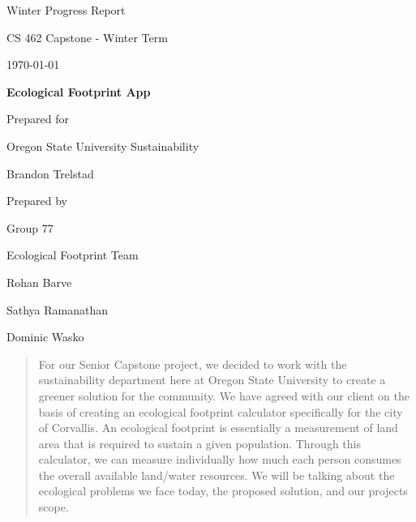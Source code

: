 \documentclass[onecolumn, draftclsnofoot,10pt, compsoc, tikz]{IEEEtran}
\def \CapstoneTeamName{		Ecological Footprint Team}
\def \CapstoneTeamNumber{		77}
\def \GroupMemberOne{			Rohan Barve}
\def \GroupMemberTwo{			Sathya Ramanathan}
\def \GroupMemberThree{			Dominic Wasko}
\def \CapstoneProjectName{		Ecological Footprint App}
\def \CapstoneSponsorCompany{	Oregon State University Sustainability}
\def \CapstoneSponsorPerson{		Brandon Trelstad} %
\def \DocType{Winter Progress Report}
\newcommand{\NameSigPair}[1]{\par
\makebox[2.75in][r]{#1} \hfil 	\makebox[3.25in]{\makebox[2.25in]{\hrulefill} \hfill		\makebox[.75in]{\hrulefill}}
\par\vspace{-12pt} \textit{\tiny\noindent
\makebox[2.75in]{} \hfil		\makebox[3.25in]{\makebox[2.25in][r]{Signature} \hfill	\makebox[.75in][r]{Date}}}}
\renewcommand{\NameSigPair}[1]{#1}
\begin{document}
\begin{titlepage}
    \begin{singlespace}
        \hfill 
        \par\vspace{.2in}
        \centering
        \scshape{
	 \huge \DocType \par
            \huge CS 462 Capstone - Winter Term \par
            {\large\today}\par
            \vspace{.5in}
            \textbf{\Huge\CapstoneProjectName}\par
            \vfill
            {\large Prepared for}\par
            \Huge \CapstoneSponsorCompany\par
            \vspace{5pt}
            {\Large\NameSigPair{\CapstoneSponsorPerson}\par}
            {\large Prepared by }\par
            Group\CapstoneTeamNumber\par
            \CapstoneTeamName\par 
            \vspace{5pt}
            {\Large
                \NameSigPair{\GroupMemberOne}\par
                \NameSigPair{\GroupMemberTwo}\par
                \NameSigPair{\GroupMemberThree}\par
            }
            \vspace{20pt}
        }
        
        \begin{abstract}
        	For our Senior Capstone project, we decided to work with the sustainability department here at Oregon State University to create a greener solution for the community. 
	We have agreed with our client on the basis of creating an ecological footprint calculator specifically for the city of Corvallis.
	An ecological footprint is essentially a measurement of land area that is required to sustain a given population. 
	Through this calculator, we can measure individually how much each person consumes the overall available land/water resources. 
	We will be talking about the ecological problems we face today, the proposed solution, and our projects scope.

        \end{abstract}  
        
        
    \end{singlespace}
\end{titlepage}
\newpage
{}
\tableofcontents
\listoffigures
\clearpage
\end{document}
